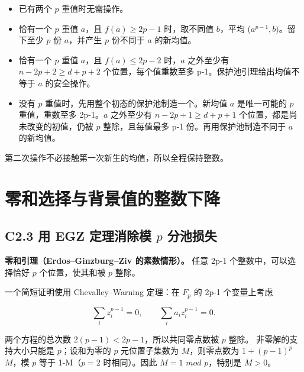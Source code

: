 \documentclass[11pt,a4paper]{article}
\newcommand{\tightlist}{\setlength{\itemsep}{0pt}\setlength{\parskip}{0pt}}
\theoremstyle{definition}
\numberwithin{equation}{section}
\begin{document}
\begin{itemize}
\tightlist
\item
  {已有两个} {\ensuremath{p}} {重值时无需操作。}
\item
  {恰有一个} {\ensuremath{p}} {重值} {\ensuremath{a}，且} {\ensuremath{f(a)\ge 2p-1}} {时，取不同值} {\ensuremath{b}，平均} {(\ensuremath{a^{p-1},b)}。留下至少} {\ensuremath{p}} {份} {\ensuremath{a}，并产生} {\ensuremath{p}} {份不同于} {\ensuremath{a}} {的新均值。}
\item
  {恰有一个} {\ensuremath{p}} {重值} {\ensuremath{a}，且} {\ensuremath{f(a)\le 2p-2}} {时，\ensuremath{a}} {之外至少有} {\ensuremath{n-2p+2\ge d+p+2}} {个位置，每个值重数至多} {p-1。保护池引理给出均值不等于} {\ensuremath{a}} {的安全操作。}
\item
  {没有} {\ensuremath{p}} {重值时，先用整个初态的保护池制造一个。新均值} {\ensuremath{a}} {是唯一可能的} {\ensuremath{p}} {重值，重数至多} {2p-1。\ensuremath{a}} {之外至少有} {\ensuremath{n-2p+1\ge d+p+1}} {个位置，都是尚未改变的初值，仍被} {\ensuremath{p}} {整除，且每值最多} {p-1} {份。再用保护池制造不同于} {\ensuremath{a}} {的新均值。}
\end{itemize}

{第二次操作不必接触第一次新生的均值，所以全程保持整数。}


\section{零和选择与背景值的整数下降}\label{construct:packing}
\subsection*{\texorpdfstring{{C2.3} {用} {EGZ} {定理消除模} {\ensuremath{p}} {分池损失}}{C2.3 用 EGZ 定理消除模  分池损失}}\label{C2-h6}

\textbf{{零和引理（Erdos--Ginzburg--Ziv} {的素数情形）。}} {任意} {2p-1} {个整数中，可以选择恰好} {\ensuremath{p}} {个位置，使其和被} {\ensuremath{p}} {整除。}

{一个简短证明使用} {Chevalley--Warning} {定理：在} {\ensuremath{F_{p}}} {的} {2p-1} {个变量上考虑}

\[
\sum_i z_i^{p-1}=0,\qquad \sum_i a_i z_i^{p-1}=0.
\]

{两个方程的总次数} {\ensuremath{2(p-1)<2p-1}，所以共同零点数被} {\ensuremath{p}} {整除。} {非零解的支持大小只能是} {\ensuremath{p}；设和为零的} {\ensuremath{p}} {元位置子集数为} {\ensuremath{M}，则零点数为} {\ensuremath{1+(p-1)^{p}}} {\ensuremath{M}，模} {\ensuremath{p}} {等于} {1-M（\ensuremath{p=2}} {时相同）。因此} {\ensuremath{M=1}} {\ensuremath{mod}} {\ensuremath{p}，特别是} {\ensuremath{M>0}。}
\end{document}

